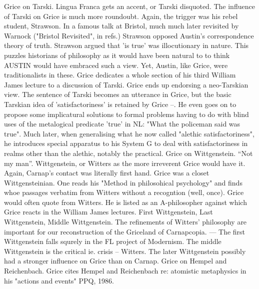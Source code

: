 \documentclass[10pt,titlepage]{book}
\begin{document}
{Grice  on Tarski. Lingua Franca gets an accent, or Tarski disquoted. The 
influence of  Tarski on Grice is much more roundoubt. Again, the trigger was 
his rebel  student, Strawson. In a famous talk at Bristol, much much later 
revisited  by Warnock ("Bristol Revisited", in refs.) Strawson opposed 
Austin's  correspondence theory of truth. Strawson argued that 'is true' was  
illocutionary in nature. This puzzles historians of philosophy as it would have  
been natural to to think AUSTIN would have embraced such a view. Yet,  
Austin, like Grice, were traditionalists in these. Grice dedicates a whole  
section of his third William James lecture to a discussion of Tarski. Grice ends  
up endorsing a neo-Tarskian view. The sentence of Tarski becomes an 
utterance in  Grice, but the basic Tarskian idea of 'satisfactoriness' is retained 
by Grice  --. He even goes on to propose some implicatural solutions to 
formal problems  having to do with blind uses of the metalogical predicate 
'true' in NL:  "What the policeman said was true". Much later, when generalising 
what he  now called "alethic satisfactoriness", he introduces special 
apparatus to his  System G to deal with satisfactoriness in realms other than the 
alethic,  notably the practical.  
Grice  on Wittgenstein. “Not my man”. Wittgenstein, or Witters as the more 
irreverent  Grice would have it. Again, Carnap's contact was literally 
first hand. Grice  was a closet Wittgensteinian. One reads his "Method in 
philosohical  psychology" and finds whoe passages verbatim from Witters without a 
recogntion  (well, once). Grice would often quote from Witters. He is listed 
as an  A-philosopher against which Grice reacts in the William James 
lectures. First  Wittgenstein, Last Wittgenstein, Middle Wittgenstein. The 
refinements of  Witters' philosophy are important for our reconstruction of the 
Griceland of  Carnapcopia. --- The first Wittgenstein falls squrely in the FL 
project of  Modernism. The middle Wittgenstein is the critical ie. crisis -- 
Witters. The  later Wittgenstein possibly had  a stronger influence on Grice 
than on  Carnap. 
Grice  on Hempel and Reichenbach. Grice cites Hempel and Reichenbach re: 
atomistic  metaphysics in his "actions and events" PPQ, 1986.  
}
\end{document}
